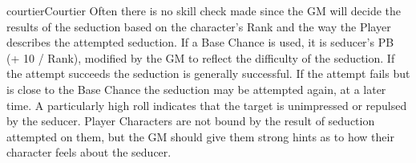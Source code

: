 \begin{Skill}[2.1]{courtier}{Courtier}
Often there is no skill check made since the GM will decide the
results of the seduction based on the character’s Rank and the way the
Player describes the attempted seduction. If a Base Chance is used, it
is seducer’s PB (+ 10 / Rank), modified by the GM to reflect the
difficulty of the seduction. If the attempt succeeds the seduction is
generally successful. If the attempt fails but is close to the Base
Chance the seduction may be attempted again, at a later time. A
particularly high roll indicates that the target is unimpressed or
repulsed by the seducer.  Player Characters are not bound by the
result of seduction attempted on them, but the GM should give them
strong hints as to how their character feels about the seducer.

\end{Skill}
